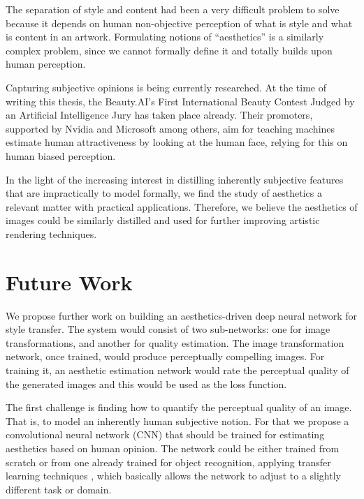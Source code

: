 The separation of style and content had been a very difficult problem to solve because it depends on human non-objective perception of what is style and what is content in an artwork.
Formulating notions of ``aesthetics'' is a similarly complex problem, since we cannot formally define it and totally builds upon human perception.

Capturing subjective opinions is being currently researched.
At the time of writing this thesis, the Beauty.AI's First International Beauty Contest Judged by an Artificial Intelligence Jury \cite{YouthLaboratories} has taken place already.
Their promoters, supported by Nvidia and Microsoft among others, aim for teaching machines estimate human attractiveness by looking at the human face, relying for this on human biased perception.

In the light of the increasing interest in distilling inherently subjective features that are impractically to model formally, we find the study of aesthetics a relevant matter with practical applications.
Therefore, we believe the aesthetics of images could be similarly distilled and used for further improving artistic rendering techniques.



\section{Future Work}
\label{sec:conclusion:future}

We propose further work on building an aesthetics-driven deep neural network for style transfer.
The system would consist of two sub-networks: one for image transformations, and another for quality estimation.
The image transformation network, once trained, would produce perceptually compelling images.
For training it, an aesthetic estimation network would rate the perceptual quality of the generated images and this would be used as the loss function.

The first challenge is finding how to quantify the perceptual quality of an image.
That is, to model an inherently human subjective notion.
For that we propose a convolutional neural network (CNN) that should be trained for estimating aesthetics based on human opinion.
The network could be either trained from scratch or from one already trained for object recognition, applying transfer learning techniques \cite{Pan2010}, which basically allows the network to adjust to a slightly different task or domain.

